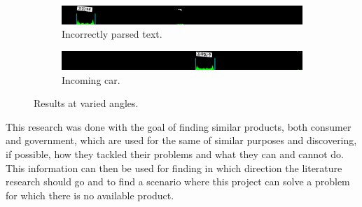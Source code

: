 \begin{figure}[ht]
        \centering
        \begin{subfigure}{\textwidth}
            \includegraphics[width=\textwidth]{plaatjes/85-offset-1}
            \caption{Incorrectly parsed text.}
            \label{fig:different-height-band-1}
        \end{subfigure}%

        \begin{subfigure}{\textwidth}
            \includegraphics[width=\textwidth]{plaatjes/85-offset-2}
            \caption{Incoming car.}
            \label{fig:different-height-band-2}
        \end{subfigure}%

        \caption{Results at varied angles.}
        \label{fig:different-height-bands}
\end{figure}%


This research was done with the goal of finding similar products, both consumer and government, which are used for the same of similar purposes and discovering, if possible, how they tackled their problems and what they can and cannot do. This information can then be used for finding in which direction the literature research should go and to find a scenario where this project can solve a problem for which there is no available product. 


